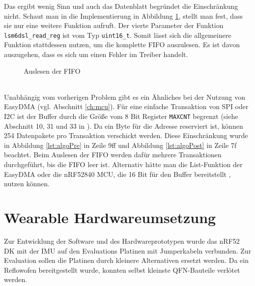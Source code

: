Das ergibt wenig Sinn und auch das Datenblatt begründet die Einschränkung nicht.
Schaut man in die Implementierung in Abbildung \ref{lst:fifoRead}, stellt man fest, dass sie nur eine weitere Funktion aufruft.
Der vierte Parameter der Funktion \texttt{lsm6dsl\_read\_reg} ist vom Typ \texttt{uint16\_t}.
Somit lässt sich die allgemeinere Funktion stattdessen nutzen, um die komplette FIFO auszulesen.
Es ist davon auszugehen, dass es sich um einen Fehler im Treiber handelt.
\begin{figure}[hbtp]
	
	\caption{Auslesen der FIFO}
	\label{lst:fifoRead}
\end{figure}\\
Unabhängig vom vorherigen Problem gibt es ein Ähnliches bei der Nutzung von EasyDMA (vgl. Abschnitt \ref{ch:mcu}).
Für eine einfache Transaktion von SPI oder I2C ist der Buffer durch die Größe vom 8 Bit Register \texttt{MAXCNT} begrenzt (siehe Abschnitt 10, 31 und 33 in \cite{datasheet_nrf52832}).
Da ein Byte für die Adresse reserviert ist, können 254 Datenpakete pro Transaktion verschickt werden.
Diese Einschränkung wurde in Abbildung \ref{lst:algoPre} in Zeile 9ff und Abbildung \ref{lst:algoPost} in Zeile 7f beachtet.
Beim Auslesen der FIFO werden dafür mehrere Transaktionen durchgeführt, bis die FIFO leer ist.
Alternativ hätte man die List-Funktion der EasyDMA oder die nRF52840 MCU, die 16 Bit für den Buffer bereitstellt \cite{datasheet_nrf52840}, nutzen können.

\section{Wearable Hardwareumsetzung}
Zur Entwicklung der Software und des Hardwareprototypen wurde das nRF52 DK mit der IMU auf den Evaluations Platinen mit Jumperkabeln verbunden.
Zur Evaluation sollen die Platinen durch kleinere Alternativen ersetzt werden.
Da ein Reflowofen bereitgestellt wurde, konnten selbst kleinste QFN-Bauteile verlötet werden.





